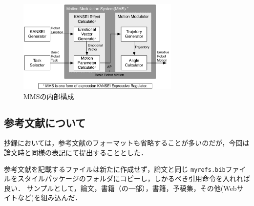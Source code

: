 \documentclass[a4paper,10pt,twocolumn]{jsarticle}
\begin{document}
\begin{figure}[b]
    \centering
    \includegraphics[width=8cm]{MMS.pdf}
    \vspace{-7mm}
    \caption{MMSの内部構成}
    \label{fig:mms}
    \vspace{5mm}
\end{figure}

\subsection{参考文献について}
抄録においては，参考文献のフォーマットも省略することが多いのだが，今回は論文時と同様の表記にて提出することとした．

参考文献を記載するファイルは新たに作成せず，論文と同じ \verb+myrefs.bib+ファイルをスタイルパッケージのフォルダにコピーし，しかるべき引用命令を入れれば良い．
サンプルとして，論文\cite{Kogami2009}，書籍（の一部）\cite{WelfareJapan}，書籍\cite{Nakata2010}，予稿集\cite{Miyaji2003ROMAN}，その他(Webサイトなど)\cite{HTUlatex}を組み込んだ．

%
\end{document}
